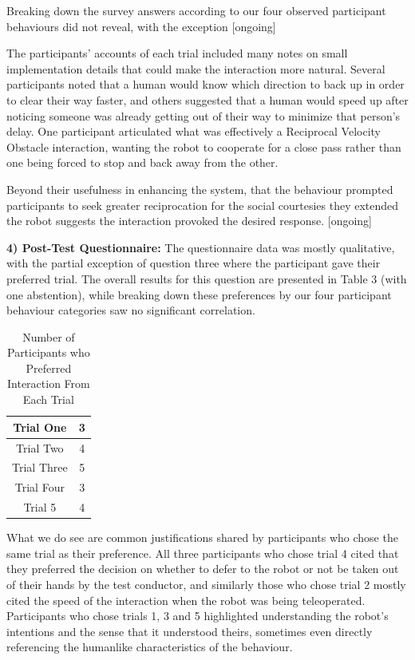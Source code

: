 \documentclass[letterpaper, 10 pt, conference]{ieeeconf}  %
\begin{document}
Breaking down the survey answers according to our four observed participant behaviours did not reveal, with the exception [ongoing]

The participants’ accounts of each trial included many notes on small implementation details that could make the interaction more natural. Several participants noted that a human would know which direction to back up in order to clear their way faster, and others suggested that a human would speed up after noticing someone was already getting out of their way to minimize that person's delay. One participant articulated what was effectively a Reciprocal Velocity Obstacle interaction, wanting the robot to cooperate for a close pass rather than one being forced to stop and back away from the other.

Beyond their usefulness in enhancing the system, that the behaviour prompted participants to seek greater reciprocation for the social courtesies they extended the robot suggests the interaction provoked the desired response. [ongoing]

\textbf{4) Post-Test Questionnaire:} The questionnaire data was mostly qualitative, with the partial exception of question three where the participant gave their preferred trial. The overall results for this question are presented in Table 3 (with one abstention), while breaking down these preferences by our four participant behaviour categories saw no significant correlation.

\begin{table}[h]
\caption{Number of Participants who Preferred Interaction From Each Trial }
\label{Preferemces}
\begin{center}
\begin{tabular}{|c||c|}
\hline
Trial One & 3\\
\hline
Trial Two & 4\\
\hline
Trial Three & 5\\
\hline
Trial Four & 3\\
\hline
Trial 5 & 4\\
\hline
\end{tabular}
\end{center}
\end{table}

What we do see are common justifications shared by participants who chose the same trial as their preference. All three participants who chose trial 4 cited that they preferred the decision on whether to defer to the robot or not be taken out of their hands by the test conductor, and similarly those who chose trial 2 mostly cited the speed of the interaction when the robot was being teleoperated. Participants who chose trials 1, 3 and 5 highlighted understanding the robot's intentions and the sense that it understood theirs, sometimes even directly referencing the humanlike characteristics of the behaviour.
\end{document}
